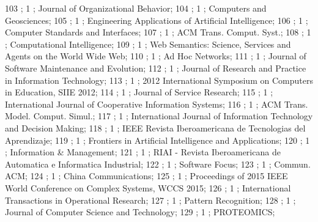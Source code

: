 103 ; 1 ; Journal of Organizational Behavior; 
104 ; 1 ; Computers and Geosciences; 
105 ; 1 ; Engineering Applications of Artificial Intelligence; 
106 ; 1 ; Computer Standards and Interfaces; 
107 ; 1 ; ACM Trans. Comput. Syst.; 
108 ; 1 ; Computational Intelligence; 
109 ; 1 ; Web Semantics: Science, Services and Agents on the World Wide Web; 
110 ; 1 ; Ad Hoc Networks; 
111 ; 1 ; Journal of Software Maintenance and Evolution; 
112 ; 1 ; Journal of Research and Practice in Information Technology; 
113 ; 1 ; 2012 International Symposium on Computers in Education, SIIE 2012; 
114 ; 1 ; Journal of Service Research; 
115 ; 1 ; International Journal of Cooperative Information Systems; 
116 ; 1 ; ACM Trans. Model. Comput. Simul.; 
117 ; 1 ; International Journal of Information Technology and Decision Making; 
118 ; 1 ; IEEE Revista Iberoamericana de Tecnologias del Aprendizaje; 
119 ; 1 ; Frontiers in Artificial Intelligence and Applications; 
120 ; 1 ; Information {\&} Management; 
121 ; 1 ; RIAI - Revista Iberoamericana de Automatica e Informatica Industrial; 
122 ; 1 ; Software Focus; 
123 ; 1 ; Commun. ACM; 
124 ; 1 ; China Communications; 
125 ; 1 ; Proceedings of 2015 IEEE World Conference on Complex Systems, WCCS 2015; 
126 ; 1 ; International Transactions in Operational Research; 
127 ; 1 ; Pattern Recognition; 
128 ; 1 ; Journal of Computer Science and Technology; 
129 ; 1 ; PROTEOMICS; 
